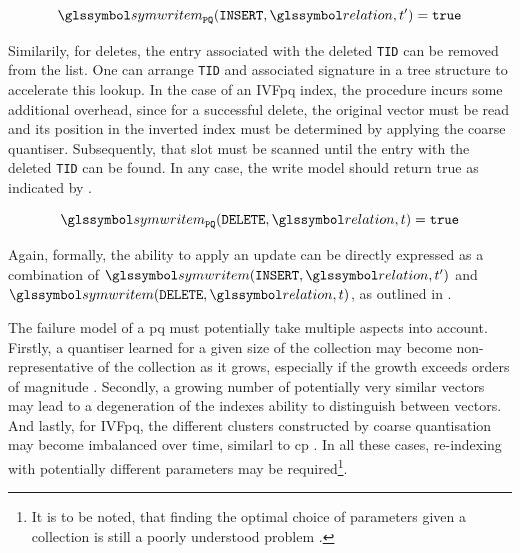 \begin{equation}
    \label{equation:write_model_insert_pq}
    \symwritem_{\mathtt{PQ}}(\mathtt{INSERT}, \relation, t^{\prime}) = \mathtt{true}
\end{equation}

Similarily, for deletes, the entry associated with the deleted \texttt{TID} can be removed from the list. One can arrange \texttt{TID} and associated signature in a tree structure to accelerate this lookup. In the case of an IVF\acrshort{pq} index, the procedure incurs some additional overhead, since for a successful delete, the original vector must be read and its position in the inverted index must be determined by applying the coarse quantiser. Subsequently, that slot must be scanned until the entry with the deleted \texttt{TID} can be found. In any case, the write model should return true as indicated by .

\begin{equation}
    \label{equation:write_model_delete_pq}
    \symwritem_{\mathtt{PQ}}(\mathtt{DELETE}, \relation, t) = \mathtt{true}
\end{equation}

Again, formally, the ability to apply an update can be directly expressed as a combination of $\symwritem(\mathtt{INSERT}, \relation, t^{\prime})$ and $ \symwritem(\mathtt{DELETE}, \relation, t)$, as outlined in .

The failure model of a \acrshort{pq} must potentially take multiple aspects into account. Firstly, a quantiser learned for a given size of the collection may become non-representative of the collection as it grows, especially if the growth exceeds orders of magnitude \cite{Liu:2020Online}. Secondly, a growing number of potentially very similar vectors may lead to a degeneration of the indexes ability to distinguish between vectors. And lastly, for IVF\acrshort{pq}, the different clusters constructed by coarse quantisation may become imbalanced over time, similarl to \acrshort{cp} \cite{Chierichetti:2007Finding}. In all these cases, re-indexing with potentially different parameters may be required\footnote{It is to be noted, that finding the optimal choice of parameters given a collection is still a poorly understood problem \cite{Ge:2014Optimized}.}.